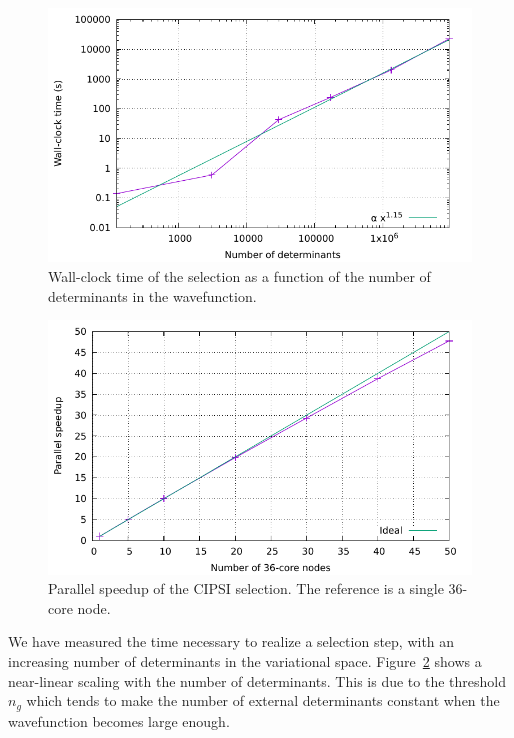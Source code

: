 \documentclass[./thesis.tex]{subfiles}
\begin{document}
\begin{figure}[h]
    \begin{center}
      \includegraphics[width=0.8\columnwidth]{figures/perf/scaling_sel_det}
      \caption{Wall-clock time of the selection as a function of the number of
determinants in the wavefunction.}
      \label{fig:scaling_sel_ndet}
    \end{center}
\end{figure}

\begin{figure}[h]
    \begin{center}
      \includegraphics[width=0.8\columnwidth]{figures/perf/scaling_sel_node}
      \caption{Parallel speedup of the CIPSI selection. The reference is a single 36-core node.}
      \label{fig:scaling_sel_node}
    \end{center}
\end{figure}

We have measured the time necessary to realize a selection step, with an
increasing number of determinants in the variational space.
Figure~\ref{fig:scaling_sel_node} shows a near-linear scaling with the number of
determinants. This is due to the threshold $n_g$ which tends to make the number of external determinants constant when the wavefunction becomes large enough.
\end{document}
